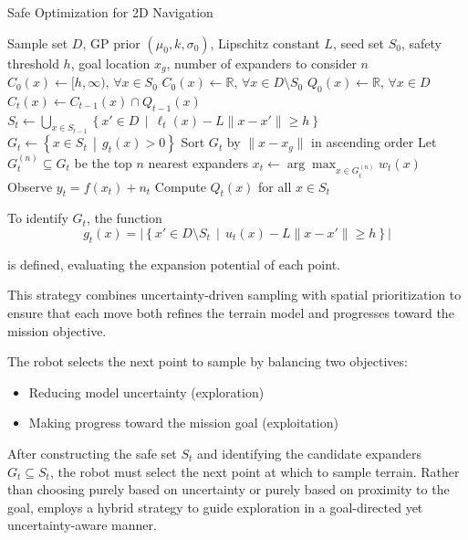 \begin{algorithm}[H]
\caption{Safe Optimization for 2D Navigation}
\begin{algorithmic}[1]
\Require Sample set \( D \), GP prior \( (\mu_0, k, \sigma_0) \), Lipschitz constant \( L \), seed set \( S_0 \), safety threshold \( h \), goal location \( x_g \), number of expanders to consider \( n \)
\State \( C_0(x) \gets [h, \infty), \, \forall x \in S_0 \)
\State \( C_0(x) \gets \mathbb{R}, \, \forall x \in D \setminus S_0 \)
\State \( Q_0(x) \gets \mathbb{R}, \, \forall x \in D \)
    \State \( C_t(x) \gets C_{t-1}(x) \cap Q_{t-1}(x) \)
    \State \( S_t \gets \bigcup_{x \in S_{t-1}} \left\{ x' \in D \,\middle|\, \ell_t(x) - L \|x-x'\| \geq h \right\} \)
    \State \( G_t \gets \left\{ x \in S_t \,\middle|\, g_t(x) > 0 \right\} \)
    \State Sort \( G_t \) by \( \|x - x_g\| \) in ascending order
    \State Let \( G_t^{(n)} \subseteq G_t \) be the top \( n \) nearest expanders
    \State \( x_t \gets \arg\max_{x \in G_t^{(n)}} w_t(x) \)
    \State Observe \( y_t = f(x_t) + n_t \)
    \State Compute \( Q_t(x) \) for all \( x \in S_t \)
\EndFor
\end{algorithmic}
\end{algorithm}

To identify \(G_t\), the function
\begin{equation}
    g_t(x) = \left| \left\{ x' \in D \setminus S_t \,\middle|\, u_t(x) - L \|x - x'\| \geq h \right\} \right|
\end{equation}

is defined, evaluating the expansion potential of each point.

This strategy combines uncertainty-driven sampling with spatial prioritization to ensure that each move both refines the terrain model and progresses toward the mission objective.

The robot selects the next point to sample by balancing two objectives:
\begin{itemize}
    \item Reducing model uncertainty (exploration)
    \item Making progress toward the mission goal (exploitation)
\end{itemize}

After constructing the safe set \( S_t \) and identifying the candidate expanders \( G_t \subseteq S_t \), the robot must select the next point at which to sample terrain. Rather than choosing purely based on uncertainty or purely based on proximity to the goal, \algoname{} employs a hybrid strategy to guide exploration in a goal-directed yet uncertainty-aware manner.


